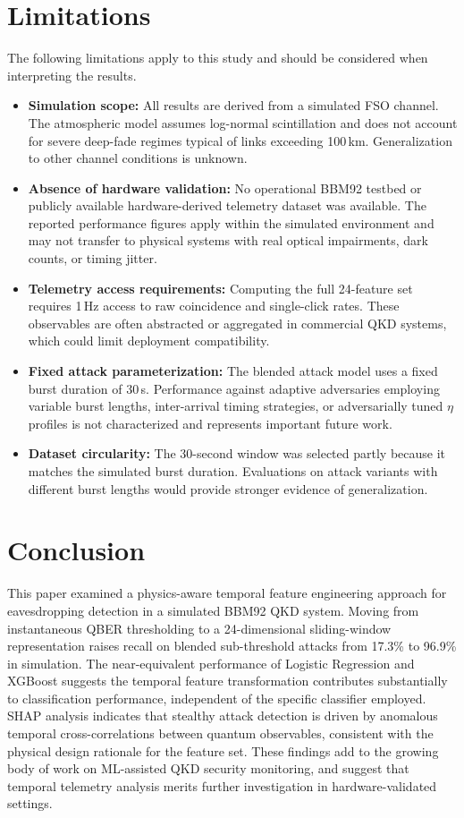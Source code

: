\documentclass[conference]{IEEEtran}
\begin{document}
\section{Limitations}

The following limitations apply to this study and should be considered when interpreting the results.

\begin{itemize}
    \item \textbf{Simulation scope:} All results are derived from a simulated FSO channel. The atmospheric model assumes log-normal scintillation and does not account for severe deep-fade regimes typical of links exceeding 100\,km. Generalization to other channel conditions is unknown.
    \item \textbf{Absence of hardware validation:} No operational BBM92 testbed or publicly available hardware-derived telemetry dataset was available. The reported performance figures apply within the simulated environment and may not transfer to physical systems with real optical impairments, dark counts, or timing jitter.
    \item \textbf{Telemetry access requirements:} Computing the full 24-feature set requires 1\,Hz access to raw coincidence and single-click rates. These observables are often abstracted or aggregated in commercial QKD systems, which could limit deployment compatibility.
    \item \textbf{Fixed attack parameterization:} The blended attack model uses a fixed burst duration of 30\,s. Performance against adaptive adversaries employing variable burst lengths, inter-arrival timing strategies, or adversarially tuned $\eta$ profiles is not characterized and represents important future work.
    \item \textbf{Dataset circularity:} The 30-second window was selected partly because it matches the simulated burst duration. Evaluations on attack variants with different burst lengths would provide stronger evidence of generalization.
\end{itemize}

\section{Conclusion}

This paper examined a physics-aware temporal feature engineering approach for eavesdropping detection in a simulated BBM92 QKD system. Moving from instantaneous QBER thresholding to a 24-dimensional sliding-window representation raises recall on blended sub-threshold attacks from 17.3\% to 96.9\% in simulation. The near-equivalent performance of Logistic Regression and XGBoost suggests the temporal feature transformation contributes substantially to classification performance, independent of the specific classifier employed. SHAP analysis indicates that stealthy attack detection is driven by anomalous temporal cross-correlations between quantum observables, consistent with the physical design rationale for the feature set. These findings add to the growing body of work on ML-assisted QKD security monitoring, and suggest that temporal telemetry analysis merits further investigation in hardware-validated settings.



\end{document}
